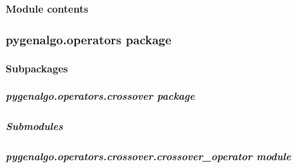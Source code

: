 \documentclass[letterpaper,10pt,english]{sphinxmanual}
\begin{document}
\paragraph{Module contents}
\label{\detokenize{pygenalgo.genome:module-pygenalgo.genome}}\label{\detokenize{pygenalgo.genome:module-contents}}
\sphinxstepscope


\subsubsection{pygenalgo.operators package}
\label{\detokenize{pygenalgo.operators:pygenalgo-operators-package}}\label{\detokenize{pygenalgo.operators::doc}}

\paragraph{Subpackages}
\label{\detokenize{pygenalgo.operators:subpackages}}
\sphinxstepscope


\subparagraph{pygenalgo.operators.crossover package}
\label{\detokenize{pygenalgo.operators.crossover:pygenalgo-operators-crossover-package}}\label{\detokenize{pygenalgo.operators.crossover::doc}}

\subparagraph{Submodules}
\label{\detokenize{pygenalgo.operators.crossover:submodules}}

\subparagraph{pygenalgo.operators.crossover.crossover\_operator module}
\label{\detokenize{pygenalgo.operators.crossover:module-pygenalgo.operators.crossover.crossover_operator}}\label{\detokenize{pygenalgo.operators.crossover:pygenalgo-operators-crossover-crossover-operator-module}}
\end{document}
